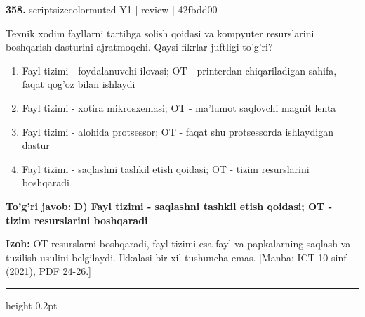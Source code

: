 \documentclass[10pt,a4paper]{article}
\begin{document}
{\bfseries\sffamily\color{ink} 358.} {scriptsizecolor{muted} Y1 | review | 42fbdd00}
\par
Texnik xodim fayllarni tartibga solish qoidasi va kompyuter resurslarini boshqarish dasturini ajratmoqchi. Qaysi fikrlar juftligi to'g'ri?
\begin{enumerate}[label=\Alph*),leftmargin=9mm]
\item Fayl tizimi - foydalanuvchi ilovasi; OT - printerdan chiqariladigan sahifa, faqat qog'oz bilan ishlaydi
\item Fayl tizimi - xotira mikrosxemasi; OT - ma'lumot saqlovchi magnit lenta
\item Fayl tizimi - alohida protsessor; OT - faqat shu protsessorda ishlaydigan dastur
\item Fayl tizimi - saqlashni tashkil etish qoidasi; OT - tizim resurslarini boshqaradi
\end{enumerate}
\begin{tcolorbox}[enhanced,breakable,colback=teal!4,colframe=teal!60!black,boxrule=0.45pt,arc=1.2mm,left=2.7mm,right=2.7mm,top=1.8mm,bottom=1.8mm,before skip=2mm,after skip=2mm]
{\bfseries\sffamily\color{teal}To'g'ri javob:} \textbf{D) Fayl tizimi - saqlashni tashkil etish qoidasi; OT - tizim resurslarini boshqaradi}
\par\smallskip
{\bfseries Izoh:} OT resurslarni boshqaradi, fayl tizimi esa fayl va papkalarning saqlash va tuzilish usulini belgilaydi. Ikkalasi bir xil tushuncha emas. [Manba: ICT 10-sinf (2021), PDF 24-26.]
\end{tcolorbox}
\vspace{2mm}\hrule height 0.2pt\vspace{3mm}
\end{document}
